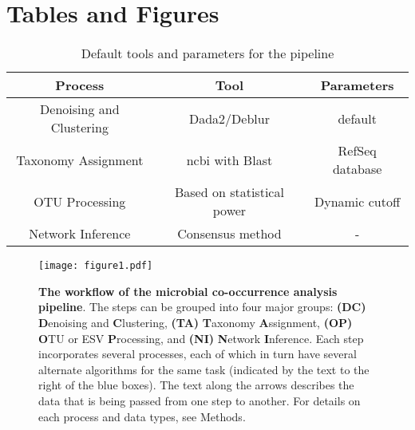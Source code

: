 
\newpage
\section*{Tables and Figures}


  \begin{table}[h]
    \centering
    \small
    \begin{tabular}{|c|c|c|}
      \hline
      \textbf{Process} & \textbf{Tool} & \textbf{Parameters} \\
      \hline
      Denoising and Clustering & Dada2/Deblur & default \\
      Taxonomy Assignment & \ac{ncbi} with Blast & RefSeq database \\
      OTU Processing & Based on statistical power & Dynamic cutoff \\
      Network Inference & Consensus method & - \\
      \hline
    \end{tabular}
    \caption{Default tools and parameters for the pipeline}
    \label{tab:default_options}
  \end{table}
  

  \begin{figure}[h]
    \centering
    \texttt{[image: figure1.pdf]}
    \caption{
      \textbf{The workflow of the microbial co-occurrence analysis pipeline}.
      The steps can be grouped into four major groups: \textbf{(DC)} \textbf{D}enoising and \textbf{C}lustering, \textbf{(TA)} \textbf{T}axonomy \textbf{A}ssignment, \textbf{(OP)} \textbf{O}TU or ESV \textbf{P}rocessing, and \textbf{(NI)} \textbf{N}etwork \textbf{I}nference.
      Each step incorporates several processes, each of which in turn have several alternate algorithms for the same task (indicated by the text to the right of the blue boxes).
      The text along the arrows describes the data that is being passed from one step to another. For details on each process and data types, see Methods.
    }
    \label{fig:figure1}
  \end{figure}
  \FloatBarrier
  \newpage
  
